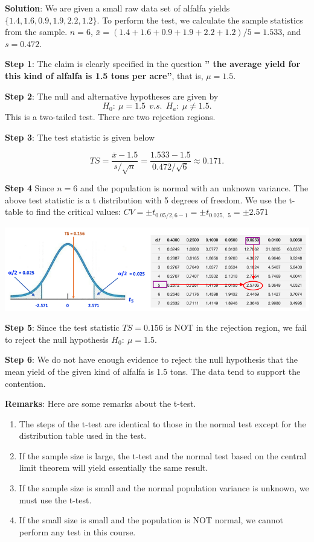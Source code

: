 \documentclass[
]{book}
\begin{document}
\textbf{Solution}: We are given a small raw data set of alfalfa yields \(\{ 1.4, 1.6, 0.9, 1.9, 2.2, 1.2 \}\). To perform the test, we calculate the sample statistics from the sample. \(n = 6\), \(\bar{x} = (1.4 + 1.6 + 0.9 + 1.9 + 2.2 + 1.2)/5 = 1.533\), and \(s = 0.472\).

\textbf{Step 1}: The claim is clearly specified in the question \textbf{'' the average yield for this kind of alfalfa is 1.5 tons per acre''}, that is, \(\mu = 1.5\).

\textbf{Step 2}: The null and alternative hypotheses are given by
\[
H_0: \ \mu = 1.5 \ \ v.s. \  \  H_a: \ \mu \ne 1.5.
\]
This is a two-tailed test. There are two rejection regions.

\textbf{Step 3}: The test statistic is given below

\[
TS = \frac{\bar{x}-1.5}{s/\sqrt{n}} = \frac{1.533 - 1.5}{0.472/\sqrt{6}} \approx 0.171. 
\]

\textbf{Step 4} Since \(n = 6\) and the population is normal with an unknown variance. The above test statistic is a t distribution with 5 degrees of freedom. We use the t-table to find the critical values: \(CV = \pm t_{0.05/2, 6-1} = \pm t_{0.025, \ \ 5}= \pm 2.571\)

\begin{center}\includegraphics[width=1\linewidth]{week10/example01} \end{center}

\textbf{Step 5}: Since the test statistic \(TS = 0.156\) is NOT in the rejection region, we fail to reject the null hypothesis \(H_0: \ \mu = 1.5\).

\textbf{Step 6}: We do not have enough evidence to reject the null hypothesis that the mean yield of the given kind of alfalfa is 1.5 tons. The data tend to support the contention.

\hfill\break

\textbf{Remarks}: Here are some remarks about the t-test.

\begin{enumerate}
\def\labelenumi{\arabic{enumi}.}
\item
  The steps of the t-test are identical to those in the normal test except for the distribution table used in the test.
\item
  If the sample size is large, the t-test and the normal test based on the central limit theorem will yield essentially the same result.
\item
  If the sample size is small and the normal population variance is unknown, we must use the t-test.
\item
  If the small size is small and the population is NOT normal, we cannot perform any test in this course.
\end{enumerate}
\end{document}
